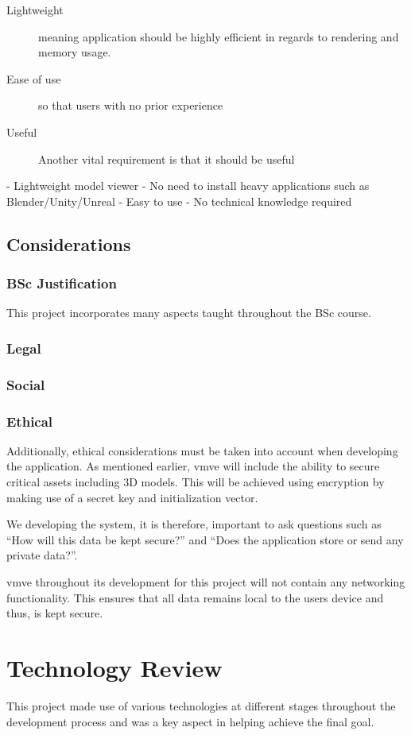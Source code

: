\documentclass[11pt]{article}
\begin{document}
\begin{description}
\item[Lightweight] meaning application should be highly
  efficient in regards to rendering and memory usage.
\item[Ease of use] so that users with no prior experience
\item[Useful]
  Another vital requirement is that it should be useful
\end{description}

- Lightweight model viewer - No need to install heavy
applications such as Blender/Unity/Unreal - Easy to use - No technical
knowledge required

\subsection{Considerations}

\subsubsection{BSc Justification}
This project incorporates many aspects taught throughout the BSc course.

\subsubsection{Legal}
\subsubsection{Social}
\subsubsection{Ethical}
Additionally, ethical considerations must be taken into account when developing
the application. As mentioned earlier, \gls{vmve} will include the ability to secure
critical assets including 3D models. This will be achieved using encryption by
making use of a secret key and initialization vector.

We developing the system, it is therefore, important to ask questions such as
``How will this data be kept secure?'' and ``Does the application store or send any
private data?''. 


\gls{vmve} throughout its development for this project will not contain any networking
functionality. This ensures that all data remains local to the users device and
thus, is kept secure.


\section{Technology Review}
This project made use of various technologies at different stages throughout the
development process and was a key aspect in helping achieve the final goal.
\end{document}
